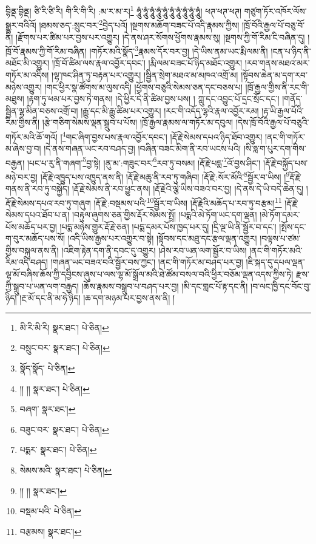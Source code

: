 བྷིནྡ་བྷིནྡ། ཙི་རི་ཙི་རི། གི་རི་གི་རི། :མ་ར་མ་ར།\footnote{མི་རི་མི་རི།  སྣར་ཐང་།  པེ་ཅིན། } ཧཱུཾ་ཧཱུཾ་ཧཱུཾ་ཧཱུཾ་ཧཱུཾ་ཧཱུཾ་ཧཱུཾ་ཧཱུཾ་ཧཱུཾ་ཧཱུཾ། ཕཊ་ཕཊ་ཕཊ། གཙུག་ཏོར་འཁོར་ལོས་སྒྱུར་བའིའོ། །ཐམས་ཅད་:སྲུང་བར་\footnote{བསྲུང་བར་  སྣར་ཐང་།  པེ་ཅིན། }བྱེད་པའོ། །སྔགས་མཆོག་བཟང་པོ་འདི་རྣམས་ཀྱིས། །ཁྲོ་བོའི་རྒྱལ་པོ་བཅུ་བོ་ནི། །རྫོགས་པར་ཚིམ་པར་བྱས་པར་འགྱུར། །དེ་ནས་ཤར་སོགས་ཕྱོགས་རྣམས་སུ། །སྔགས་ཀྱི་གོ་རིམ་ངི་བཞིན་དུ། །ཁྲོ་བོ་རྣམས་ཀྱི་གོ་རིམ་བཞིན། །གཏོར་མའི་སྣོད་\footnote{སྣོད་སྣོད་  པེ་ཅིན། }རྣམས་དོར་བར་བྱ། །དེ་ཡིས་ནམ་ཡང་རྨི་ལམ་ནི། །ངན་པ་ཉིད་ནི་མཐོང་མི་འགྱུར། །ཁྲོ་བོ་ཚིམ་ལས་རྣལ་འབྱོར་དབང་། །རྨི་ལམ་བཟང་པོ་ཉིད་མཐོང་འགྱུར། །རབ་གནས་མཐའ་མར་གཏོར་མ་འདིས། །ལྷ་ཁང་ཤིན་ཏུ་བརྟན་པར་འགྱུར། །སྦྱིན་སྲེག་མཐའ་མ་མཁའ་འགྲོ་མ། །སྟོབས་ཆེན་མ་དག་རབ་མཉེས་འགྱུར། །གང་ཕྱིར་སྣ་ཚོགས་མ་ལུས་འདི། །ཕྱོགས་བཅུའི་སེམས་ཅན་དང་བཅས་པ། །ཁྲོ་རྒྱལ་གྱིས་ནི་རང་གི་མཐུས། །རྟག་ཏུ་ཕམ་པར་བྱས་ཏེ་གནས། །དེ་ཕྱིར་དེ་ནི་ཚིམ་བྱས་པས། །
ཀླུ་དང་འབྱུང་པོ་དྲང་སྲོང་དང་། །གནོད་སྦྱིན་ལྷ་མིན་བཅས་འགྲོ་བ། །རྒྱུ་དང་མི་རྒྱུ་ཚིམ་པར་འགྱུར། །རང་གི་འདོད་ལྷའི་རྣལ་འབྱོར་རམ། །རྟ་ཡི་རྒྱལ་པོའི་རིམ་གྱིས་ནི། །རྩེ་གཅིག་སེམས་ལྡན་སྒྲུབ་པ་པོས། །ཁྲོ་རྒྱལ་རྣམས་ལ་གཏོར་མ་དབུལ། །དེས་ཁྲོ་བོའི་རྒྱལ་པོ་བཅུའི་གཏོར་མའི་ཆོ་གའོ། །\footnote{།། །།  སྣར་ཐང་།  པེ་ཅིན། }གང་ཞིག་བྱས་པས་རྣལ་འབྱོར་དབང་། །རྡོ་རྗེ་སེམས་དཔའ་ཉིད་ཐོབ་འགྱུར། །ནང་གི་གཏོར་མ་ཞེས་བྱ་བ། །དེ་ནས་གཞན་ཡང་རབ་བཤད་བྱ། །བཞིན་བཟང་མིག་ནི་རབ་ཡངས་པའི། །སི་ཧླ་ག་པུར་དག་གིས་བརྒྱན། །པང་པ་རུ་ནི་གཞག་\footnote{བཞག་  སྣར་ཐང་། }བྱ་སྟེ། །ནུ་མ་:གཟུང་བར་\footnote{བཟུང་བར་  སྣར་ཐང་།  པེ་ཅིན། }རབ་ཏུ་བསམ། །རྡོ་རྗེ་པདྨ་\footnote{པདྨར་  སྣར་ཐང་།  པེ་ཅིན། }འོ་བྱས་ཤིང་། །རྡོ་རྗེ་བསྐྱོད་པས་མཉེ་བར་བྱ། །རྡོ་རྗེ་འཁྱུད་པས་འཁྱུད་ནས་ནི། །རྡོ་རྗེ་མཆུ་ནི་རབ་ཏུ་གཞིབ། །རྡོ་རྗེ་:སོར་མོའི་\footnote{སེམས་མའི་  སྣར་ཐང་།  པེ་ཅིན། }སྦྱོར་བ་ཡིས། །\footnote{།། །།  སྣར་ཐང་། }རྡོ་རྗེ་གནས་ནི་རབ་ཏུ་བསྐྱོད། །རྡོ་རྗེ་སེམས་ནི་རབ་ཕྱུང་ནས། །རྡོ་རྗེའི་ལྕེ་ཡིས་བཟའ་བར་བྱ། །དེ་ནས་དེ་ཡི་བདེ་ཆེན་དུ། །རྡོ་རྗེ་སེམས་དཔའ་རབ་ཏུ་གཞུག །རྡོ་རྗེ་:བསྡམས་པའི་\footnote{བསྡམ་པའི་  པེ་ཅིན། }སྦྱོར་བ་ཡིས། །རྡོ་རྗེའི་མཆོད་པ་རབ་ཏུ་བརྩམ།\footnote{བརྩམས།  སྣར་ཐང་། } །རྡོ་རྗེ་སེམས་དཔའ་ཐོབ་པ་ན། །བརྟུལ་ཞུགས་ཅན་གྱིས་རྡོར་སེམས་སྤྲོ། །པདྨའི་མེ་ཏོག་ཡང་དག་ལྡན། །མེ་ཏོག་དམར་པོས་མཆོད་པར་བྱ། །པདྨ་མཉེས་གྱུར་རྡོ་རྗེ་ཅན། །པདྨ་དམར་པོས་ཁྱད་པར་དུ། །དྲི་ལྔ་ཡི་ནི་སྦྱོར་བ་དང་། །སྤོས་དང་ག་བུར་མཆོད་པས་སོ། །འདི་ཡིས་རྒྱས་པར་འགྱུར་བ་སྟེ། །སྟོབས་དང་མཐུ་དང་རྩལ་ལྡན་འགྱུར། །བལྟས་པ་ཙམ་གྱིས་བསྐུལ་ནས་ནི། །འཇིག་རྟེན་དག་ནི་དབང་དུ་འགྱུར། །ཤེས་རབ་ཡན་ལག་སྦྱོར་བ་ཡིས། །ནང་གི་གཏོར་མའི་རིམ་འདི་བཤད། །གཞན་ཡང་བཟའ་བའི་སྦྱོར་བས་ཀྱང་། །ནང་གི་གཏོར་མ་བཤད་པར་བྱ། །ཇི་སྐད་དུ་དཔལ་ལྡན་ལྷ་མོ་བཞིས་ཆོས་ཀྱི་དབྱིངས་ཞུས་པ་ལས་ལྷ་མོ་སྒྲོལ་མའི་ཐེ་ཚོམ་བསལ་བའི་ཕྱིར་བཅོམ་ལྡན་འདས་ཀྱིས་ཏེ། རྫས་ཀྱི་སྒྲུབ་པ་ཡན་ལག་བརྒྱད། །ཆོས་རྣམས་བསྒྲུབ་པ་བཤད་པར་བྱ། །མི་དང་གླང་པོ་རྟ་དང་ནི། །བ་ལང་ཁྱི་དང་བོང་བུ་ཉིད། །རྔ་མོ་དང་ནི་མ་ཧེ་ཉིད། །ཆ་དག་མཉམ་པར་བྱས་ནས་ནི། །
